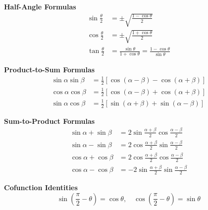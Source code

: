\documentclass[11pt, a4paper, oneside]{article}
\begin{document}
\begin{minipage}[t]{0.48\textwidth}
\textbf{Half-Angle Formulas}
\begin{align*}
\sin\frac{\theta}{2} &= \pm\sqrt{\frac{1 - \cos\theta}{2}} \\
\cos\frac{\theta}{2} &= \pm\sqrt{\frac{1 + \cos\theta}{2}} \\
\tan\frac{\theta}{2} &= \frac{\sin\theta}{1 + \cos\theta} = \frac{1 - \cos\theta}{\sin\theta}
\end{align*}
\vspace{2ex}

\textbf{Product-to-Sum Formulas}
\begin{align*}
\sin\alpha \sin\beta &= \tfrac{1}{2}[\cos(\alpha - \beta) - \cos(\alpha + \beta)] \\
\cos\alpha \cos\beta &= \tfrac{1}{2}[\cos(\alpha - \beta) + \cos(\alpha + \beta)] \\
\sin\alpha \cos\beta &= \tfrac{1}{2}[\sin(\alpha + \beta) + \sin(\alpha - \beta)]
\end{align*}
\vspace{2ex}

\textbf{Sum-to-Product Formulas}
\begin{align*}
\sin\alpha + \sin\beta &= 2\sin\frac{\alpha + \beta}{2}\cos\frac{\alpha - \beta}{2} \\
\sin\alpha - \sin\beta &= 2\cos\frac{\alpha + \beta}{2}\sin\frac{\alpha - \beta}{2} \\
\cos\alpha + \cos\beta &= 2\cos\frac{\alpha + \beta}{2}\cos\frac{\alpha - \beta}{2} \\
\cos\alpha - \cos\beta &= -2\sin\frac{\alpha + \beta}{2}\sin\frac{\alpha - \beta}{2}
\end{align*}
\vspace{2ex}


\textbf{Cofunction Identities}
\[
\sin\left(\frac{\pi}{2} - \theta\right) = \cos\theta,\quad
\cos\left(\frac{\pi}{2} - \theta\right) = \sin\theta
\]
\end{minipage}
\end{document}
